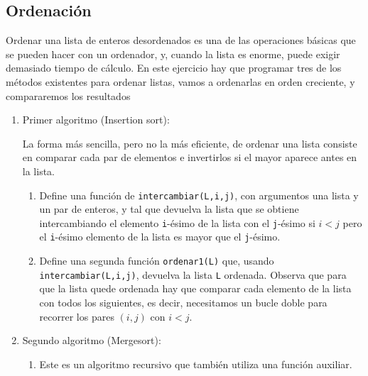 \subsection{Ordenaci\'on}\label{ordenacion}
Ordenar una lista de enteros desordenados es una de las operaciones b\'asicas
que se pueden hacer con un ordenador, y, cuando la lista es enorme, puede exigir
demasiado tiempo de c\'alculo. En este ejercicio hay que programar tres de
los m\'etodos existentes para ordenar listas, vamos a ordenarlas en orden
creciente, y compararemos los resultados




\begin{enumerate}
\item {\sc Primer algoritmo (Insertion sort):}

\medskip

La forma m\'as sencilla, pero no la m\'as eficiente,  de ordenar una lista consiste en comparar cada par de elementos e invertirlos si el mayor aparece antes en la lista. 

\begin{ejer}
\begin{enumerate}
\item Define una funci\'on de {\sage} {\tt intercambiar(L,i,j)}, con argumentos
una
lista y un par de enteros, y tal que devuelva la lista que se obtiene
intercambiando el elemento {\tt i}-\'esimo de la lista con el
{\tt j}-\'esimo si $i<j$ pero el {\tt i}-\'esimo elemento de la lista es mayor que el
{\tt j}-\'esimo. %
\item Define una segunda funci\'on {\tt ordenar1(L)} que, usando
{\tt intercambiar(L,i,j)}, devuelva la lista {\tt L} ordenada. Observa que para
que la lista quede ordenada hay que comparar cada elemento de la lista con {\sc
todos} los siguientes, es decir, necesitamos un bucle doble para recorrer los pares $(i,j)$ con $i<j$.
\end{enumerate}
\end{ejer}
\item \label{mergesort}{\sc Segundo algoritmo (Mergesort):}

\begin{ejer}
\begin{enumerate}
\item Este es un algoritmo recursivo que tambi\'en utiliza una funci\'on
auxiliar. 


\end{enumerate}
\end{ejer}
\end{enumerate}
